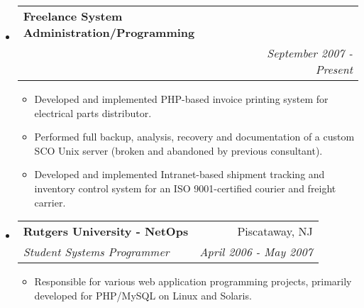 \documentclass[letterpaper,11pt]{article}
\makeatletter
\newcommand{\resitem}[1]{\item #1 \vspace{-2pt}}
\newcommand{\ressubheading}[4]{
\begin{tabular*}{7.0in}{l@{\extracolsep{\fill}}r}
		\textbf{#1} & #2 \\
		\textit{#3} & \textit{#4} \\
\end{tabular*}\vspace{-6pt}}
\makeatother
\begin{document}
\begin{itemize}
\item
        \ressubheading{Freelance System Administration/Programming}{ }{ }{September 2007 - Present}
        \begin{itemize}
               \resitem{Developed and implemented PHP-based invoice printing
                 system for electrical parts distributor.}
               \resitem{Performed full backup, analysis, recovery and documentation of a
                 custom SCO Unix server (broken and abandoned by previous consultant).}
               \resitem{Developed and implemented Intranet-based shipment tracking and
                 inventory control system for an ISO 9001-certified courier
                 and freight carrier.}
        \end{itemize}

\item
	\ressubheading{Rutgers University - NetOps}{Piscataway, NJ}{Student Systems Programmer}{April 2006 - May 2007}
	\begin{itemize}
		\resitem{Responsible for various web application programming projects, primarily developed for
                  PHP/MySQL on Linux and Solaris.}
	\end{itemize}

\end{itemize}

\pagebreak
\end{document}
